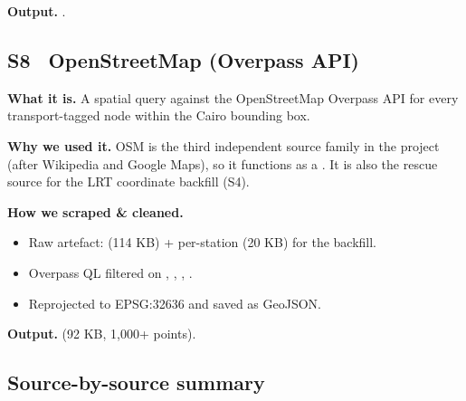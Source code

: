 \textbf{Output.} .

\subsection{S8 \textbullet\ OpenStreetMap (Overpass API)}

\textbf{What it is.} A spatial query against the OpenStreetMap
Overpass API for every transport-tagged node within the Cairo bounding
box.

\textbf{Why we used it.} OSM is the third independent source family in
the project (after Wikipedia and Google Maps), so it functions as a
. It is also the rescue source for the
LRT coordinate backfill (S4).

\textbf{How we scraped \& cleaned.}
\begin{itemize}
 \item Raw artefact:  (114 KB) +
 per-station  (20 KB) for the
 backfill.
 \item Overpass QL filtered on , ,
 , .
 \item Reprojected to EPSG:32636 and saved as GeoJSON.
\end{itemize}

\textbf{Output.}  (92 KB, 1{,}000+ points).


\subsection{Source-by-source summary}

